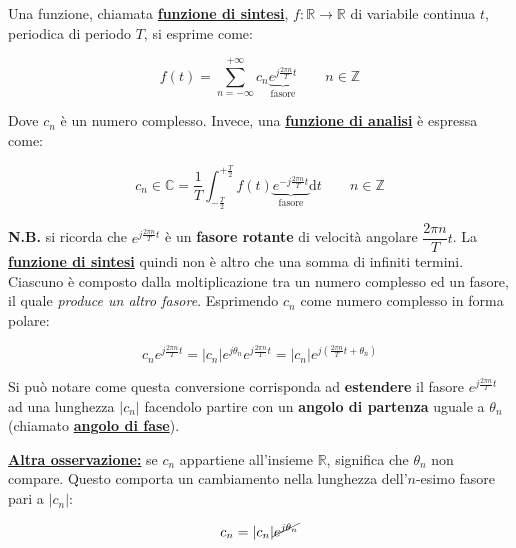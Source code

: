 \documentclass[a4paper]{article}
\begin{document}
	Una funzione, chiamata \textbf{\underline{funzione di sintesi}}, $f: \mathbb{R} \rightarrow \mathbb{R}$ di variabile continua $t$, periodica di periodo $T$, si esprime come:
	
	\begin{equation*}
		f(t) = \sum_{n = -\infty}^{+\infty} c_{n} \underbrace{e^{j \frac{2\pi n}{T}t}}_{\text{fasore}} \hspace{2em} n\in\mathbb{Z}
	\end{equation*}

	\noindent
	Dove $c_{n}$ è un numero complesso. Invece, una \textbf{\underline{funzione di analisi}} è espressa come:
	
	\begin{equation*}
		c_{n} \in \mathbb{C} = \dfrac{1}{T} \int_{-\frac{T}{2}}^{+\frac{T}{2}} f\left(t\right) \underbrace{e^{-j \frac{2\pi n}{T}t}}_{\text{fasore}} \mathrm{d}t \hspace{2em} n \in \mathbb{Z}
	\end{equation*}

	\noindent
	\textbf{N.B.} si ricorda che $e^{j \frac{2\pi n}{T}t}$ è un \textbf{fasore rotante} di velocità angolare $\dfrac{2\pi n}{T} t$.\newline
	La \textbf{\underline{funzione di sintesi}} quindi non è altro che una somma di infiniti termini. Ciascuno è composto dalla moltiplicazione tra un numero complesso ed un fasore, il quale \emph{produce un altro fasore}. Esprimendo $c_{n}$ come numero complesso in forma polare:
	
	\begin{equation*}
		c_{n} e^{j \frac{2 \pi n}{T} t} = |c_{n}| e^{j \theta_{n}} e^{j \frac{2 \pi n}{T} t} = |c_{n}| e^{j \left(\frac{2 \pi n}{T} t + \theta_{n}\right)}
	\end{equation*}

	\noindent
	Si può notare come questa conversione corrisponda ad \textbf{estendere} il fasore $e^{j\frac{2 \pi n}{T} t}$ ad una lunghezza $|c_{n}|$ facendolo partire con un \textbf{angolo di partenza} uguale a $\theta_{n}$ (chiamato \textbf{\underline{angolo di fase}}).\newline
	
	\noindent
	\textbf{\underline{Altra osservazione:}} se $c_{n}$ appartiene all'insieme $\mathbb{R}$, significa che $\theta_{n}$ non compare. Questo comporta un cambiamento nella lunghezza dell'$n$-esimo fasore pari a $|c_{n}|$:
	
	\begin{equation*}
		c_{n} = |c_{n}| \cancel{e^{j \theta_{n}}}
	\end{equation*}
\end{document}
